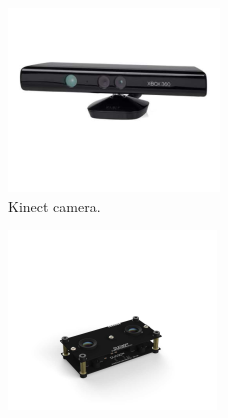 \documentclass[11pt,openany]{book}
\begin{document}
\begin{figure}[H]
    \centering
    \begin{subfigure}[H]{0.4\linewidth}
        \centering
        \includegraphics[width=\linewidth]{assets/2_15_a.png}
        \caption{{Kinect camera.}}
        \label{fig:2.15a}
    \end{subfigure}
    \begin{subfigure}[H]{0.4\linewidth}
        \centering
        \includegraphics[width=\linewidth]{assets/2_15_b.png}

\end{subfigure}
\end{figure}
\end{document}
